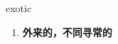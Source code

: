 
\begin{frame}
{\huge exotic}
\begin{center}
\begin{enumerate}\Large
  \item \textbf{外来的，不同寻常的}
\end{enumerate}
\end{center}
\end{frame}
